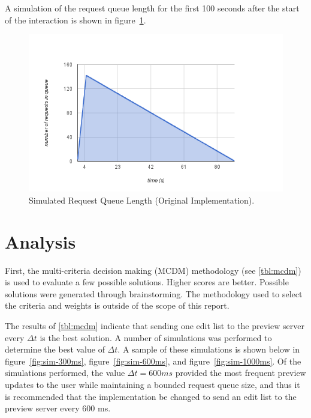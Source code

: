 \documentclass[se,resubmit]{uw-wkrpt}
\begin{document}
A simulation of the request queue length for the first 100 seconds after
the start of the interaction is shown in figure~\ref{fig:sim-orig}.

\begin{figure}
  \centering
  \includegraphics[width=6.25in]{sim-orig}
  \caption{Simulated Request Queue Length (Original Implementation).}
  \label{fig:sim-orig}
\end{figure}

\section{Analysis}

First, the multi-criteria decision making (MCDM) methodology (see
\ref{tbl:mcdm}) is used to evaluate a few possible solutions. Higher
scores are better. Possible solutions were generated through
brainstorming.  The methodology used to select the criteria and weights is
outside of the scope of this report.

The results of \ref{tbl:mcdm} indicate that sending one edit list to the
preview server every $\Delta t$ is the best solution. A number of
simulations was performed to determine the best value of $\Delta t$. A
sample of these simulations is shown below in figure~\ref{fig:sim-300ms},
figure~\ref{fig:sim-600ms}, and figure~\ref{fig:sim-1000ms}. Of the
simulations performed, the value $\Delta t=600 ms$ provided the most
frequent preview updates to the user while maintaining a bounded request
queue size, and thus it is recommended that the implementation be changed
to send an edit list to the preview server every 600 ms.
\end{document}
